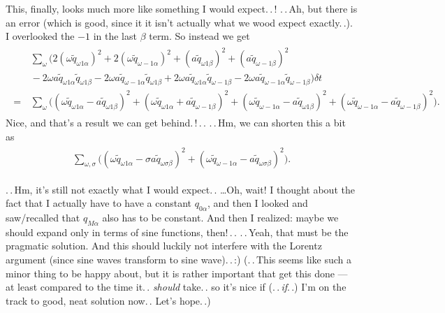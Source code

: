 \documentclass{report}
\begin{document}
This, finally, looks much more like something I would expect.\,.\,! .\,.\,Ah, but there is an error (which is good, since it it isn't actually what we wood expect exactly.\,.). I overlooked the $-1$ in the last $\beta$ term. So instead we get
\begin{align}
\begin{aligned}
	&\,\sum_{\omega} \Big(
		2(\omega \tilde q_{\omega 1\alpha})^2 
		+
		2(\omega \tilde q_{\omega-1\alpha})^2
		+
		(a \tilde q_{\omega 1\beta})^2		
		+
		(a \tilde q_{\omega-1\beta})^2\\
		&\,-
		2\omega a \tilde q_{\omega 1\alpha} \tilde q_{\omega 1\beta}
		-
		2\omega a \tilde q_{\omega-1\alpha} \tilde q_{\omega 1\beta}
		+
		2\omega a \tilde q_{\omega 1\alpha} \tilde q_{\omega-1\beta}
		-
		2\omega a \tilde q_{\omega-1\alpha} \tilde q_{\omega-1\beta}
	\Big)
	\delta t \\
	=&\,\sum_{\omega} \Big(
		(\omega \tilde q_{\omega 1\alpha} - a \tilde q_{\omega 1\beta})^2 +
		(\omega \tilde q_{\omega 1\alpha} + a \tilde q_{\omega-1\beta})^2 +
		(\omega \tilde q_{\omega-1\alpha} - a \tilde q_{\omega 1\beta})^2 +
		(\omega \tilde q_{\omega-1\alpha} - a \tilde q_{\omega-1\beta})^2
	\Big).
\end{aligned}
\end{align}
Nice, and that's a result we can get behind.\,!\,.\,. .\,.\,Hm, we can shorten this a bit as
\begin{align}
\begin{aligned}
	\sum_{\omega, \sigma} \Big(
		(\omega \tilde q_{\omega 1\alpha} - \sigma a \tilde q_{\omega\sigma\beta})^2 +
		(\omega \tilde q_{\omega-1\alpha} - a \tilde q_{\omega \sigma\beta})^2 
	\Big).
\end{aligned}
\end{align}

.\,.\,Hm, it's still not exactly what I would expect.\,. 
\ldots Oh, wait! I thought about the fact that I actually have to have a constant $q_{0\alpha}$, and then I looked and saw/recalled that $q_{M\alpha}$ also has to be constant. And then I realized: maybe we should expand only in terms of sine functions, then!\,.\,. .\,.\,Yeah, that must be the pragmatic solution. And this should luckily not interfere with the Lorentz argument (since sine waves transform to sine wave).\,.\,:) (.\,.\,This seems like such a minor thing to be happy about, but it is rather important that get this done --- at least compared to the time it.\,. \emph{should} take.\,. so it's nice if (.\,.\,\emph{if}.\,.) I'm on the track to good, neat solution now.\,. Let's hope.\,.) 
\end{document}
